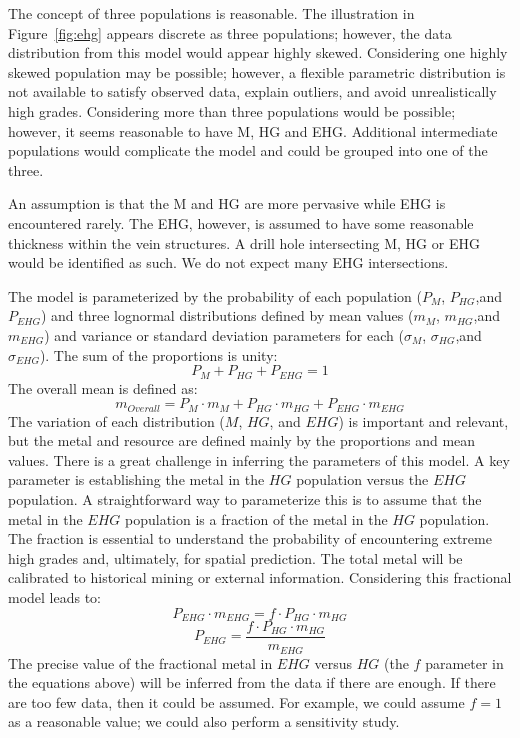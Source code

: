 The concept of three populations is reasonable. The illustration in Figure~\ref{fig:ehg} appears discrete as three populations; however, the data distribution from this model would appear highly skewed. Considering one highly skewed population may be possible; however, a flexible parametric distribution is not available to satisfy observed data, explain outliers, and avoid unrealistically high grades. Considering more than three populations would be possible; however, it seems reasonable to have M, HG and EHG. Additional intermediate populations would complicate the model and could be grouped into one of the three.

An assumption is that the M and HG are more pervasive while EHG is encountered rarely. The EHG, however, is assumed to have some reasonable thickness within the vein structures. A drill hole intersecting M, HG or EHG would be identified as such. We do not expect many EHG intersections.


The model is parameterized by the probability of each population ($P_{M}$, $P_{HG}$,and $P_{EHG}$) and three lognormal distributions defined by mean values ($m_{M}$, $m_{HG}$,and $m_{EHG}$) and variance or standard deviation parameters for each ($\sigma_{M}$, $\sigma_{HG}$,and $\sigma_{EHG}$).  The sum of the proportions is unity:
\[
    P_{M} + P_{HG} + P_{EHG}= 1
\]
The overall mean is defined as:
\[
    m_{Overall} = P_{M} \cdot m_{M}  + P_{HG} \cdot m_{HG} + P_{EHG} \cdot m_{EHG}
\]
The variation of each distribution ($M$, $HG$, and $EHG$) is important and relevant, but the metal and resource are defined mainly by the proportions and mean values. There is a great challenge in inferring the parameters of this model. A key parameter is establishing the metal in the $HG$ population versus the $EHG$ population. A straightforward way to parameterize this is to assume that the metal in the $EHG$ population is a fraction of the metal in the $HG$ population. The fraction is essential to understand the probability of encountering extreme high grades and, ultimately, for spatial prediction. The total metal will be calibrated to historical mining or external information. Considering this fractional model leads to:
\[
    P_{EHG} \cdot m_{EHG} = f \cdot P_{HG} \cdot m_{HG}
\]
\[
    P_{EHG} = \frac{f \cdot P_{HG} \cdot m_{HG}}{m_{EHG}}
\]
The precise value of the fractional metal in $EHG$ versus $HG$ (the $f$ parameter in the equations above) will be inferred from the data if there are enough. If there are too few data, then it could be assumed. For example, we could assume $f=1$ as a reasonable value; we could also perform a sensitivity study.


